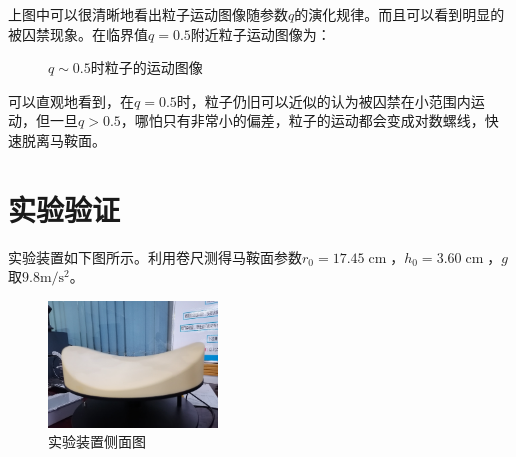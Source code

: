 \documentclass{WHUReport}
\begin{document}
\begin{multicols}{2}
	上图中可以很清晰地看出粒子运动图像随参数$q$的演化规律。而且可以看到明显的被囚禁现象。在临界值$q=0.5$附近粒子运动图像为：
	\begin{figure}[H]
		\centering  %
		\subfigbottomskip=2pt %
		\subfigcapskip=-5pt %
		\caption{$q\sim0.5$时粒子的运动图像}
	\end{figure}
	
	可以直观地看到，在$q=0.5$时，粒子仍旧可以近似的认为被囚禁在小范围内运动，但一旦$q>0.5$，哪怕只有非常小的偏差，粒子的运动都会变成对数螺线，快速脱离马鞍面。
	
	\section{实验验证}
	实验装置如下图所示。利用卷尺测得马鞍面参数$r_0=17.45\operatorname{cm}$，$h_0=3.60\operatorname{cm}$，$g$取$9.8\operatorname{m/s^2}$。
	\begin{figure}[H]
		\centering
		\includegraphics[width=0.4\textwidth]{figures/mechanic.jpg}
		\caption{实验装置侧面图}	
	\end{figure}

\end{multicols}
\end{document}
